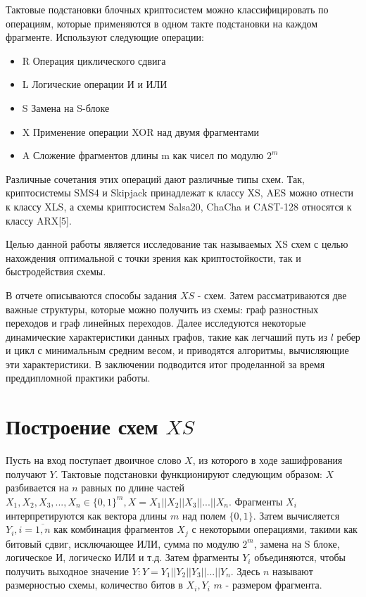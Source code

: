 \documentclass[a4paper,12pt]{extarticle}
\theoremstyle{plain} %
\begin{document}
\begin{large}
Тактовые подстановки блочных криптосистем можно классифицировать по операциям, которые применяются в одном такте подстановки на каждом фрагменте. Используют следующие операции:

\begin{itemize}
\item R
\newline Операция циклического сдвига
\item L
\newline Логические операции И и ИЛИ
\item S
\newline Замена на S-блоке
\item X
\newline Применение операции XOR над двумя фрагментами
\item A
\newline Сложение фрагментов длины m как чисел по модулю $2^m$
\end{itemize}

Различные сочетания этих операций дают различные типы схем. Так, криптосистемы SMS4 и Skipjack принадлежат к классу XS, AES можно отнести к классу XLS, а схемы криптосистем Salsa20, ChaCha и CAST-128 относятся к классу ARX[5].

Целью данной работы является исследование так называемых XS схем с целью нахождения оптимальной с точки зрения как криптостойкости, так и быстродействия схемы.

В отчете описываются способы задания $XS$ - схем. Затем рассматриваются две важные структуры, которые можно получить из схемы: граф разностных переходов и граф линейных переходов. Далее исследуются некоторые динамические характеристики данных графов, такие как легчаший путь из $l$ ребер и цикл с минимальным средним весом, и приводятся алгоритмы, вычисляющие эти характеристики. В заключении подводится итог проделанной за время преддипломной практики работы.


\newpage
\section{Построение схем $XS$}
\vspace*{1cm}

Пусть на вход поступает двоичное слово $X$, из которого в ходе зашифрования получают $Y$. Тактовые подстановки функционируют следующим образом: $X$ разбивается на $n$ равных по длине частей $X_1, X_2, X_3, ..., X_n \in \{0, 1\}^m, X = X_1||X_2||X_3||...||X_n$. Фрагменты $X_i$ интерпретируются как вектора длины $m$ над полем $\{0, 1\}$. Затем вычисляется $Y_i, i = \overline{1,n}$ как комбинация фрагментов $X_j$ с некоторыми операциями, такими как битовый сдвиг, исключающее ИЛИ, сумма по модулю $2^m$, замена на S блоке, логическое И, логическо ИЛИ и т.д. Затем фрагменты $Y_i$ объединяются, чтобы получить выходное значение $Y: Y = Y_1||Y_2||Y_3||...||Y_n$. Здесь $n$ называют размерностью схемы, количество битов в $X_i, Y_i$ $m$ - размером фрагмента.


\end{large}
\end{document}
